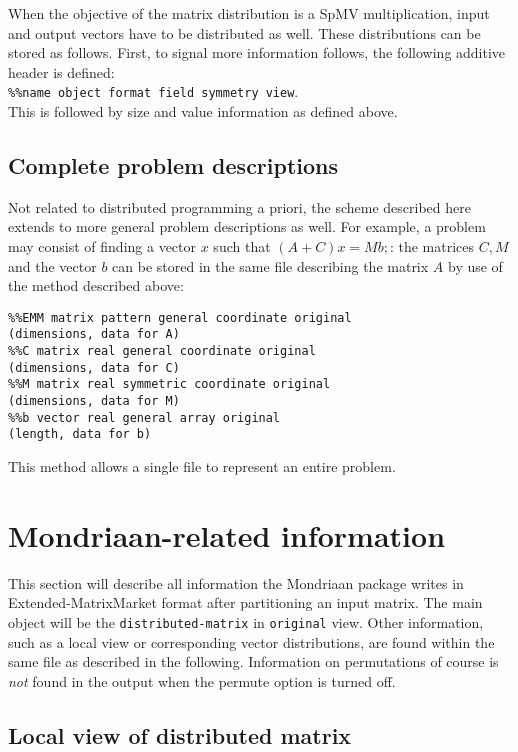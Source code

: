\documentclass[final]{amsart}
\begin{document}
When the objective of the matrix distribution is a SpMV multiplication,
input and output vectors have to be distributed as well.
These distributions can be stored as follows.
First, to signal more information follows, the following additive header is defined:\\
\verb|%%name object format field symmetry view|.\\
This is followed by size and value information as defined above.

\subsection{Complete problem descriptions}
\label{sec:complete}

Not related to distributed programming a priori,
the scheme described here extends to more general problem descriptions as well.
For example,
a problem may consist of finding a vector $x$ such that $(A+C)x=Mb;$:
the matrices $C,M$ and the vector $b$ can be stored in the same file describing the matrix $A$ by use of the method described above:
\begin{verbatim}
%%EMM matrix pattern general coordinate original
(dimensions, data for A)
%%C matrix real general coordinate original
(dimensions, data for C)
%%M matrix real symmetric coordinate original
(dimensions, data for M)
%%b vector real general array original
(length, data for b)
\end{verbatim}
This method allows a single file to represent an entire problem.

\section{Mondriaan-related information}

This section will describe all information the Mondriaan package \cite{mondriaan} writes in Extended-MatrixMarket format after partitioning an input matrix.
The main object will be the \verb|distributed-matrix| in \verb|original| view.
Other information,
such as a local view or corresponding vector distributions,
are found within the same file as described in the following.
Information on permutations of course is \emph{not} found in the output when
the permute option is turned off.

\subsection{Local view of distributed matrix}
\end{document}

